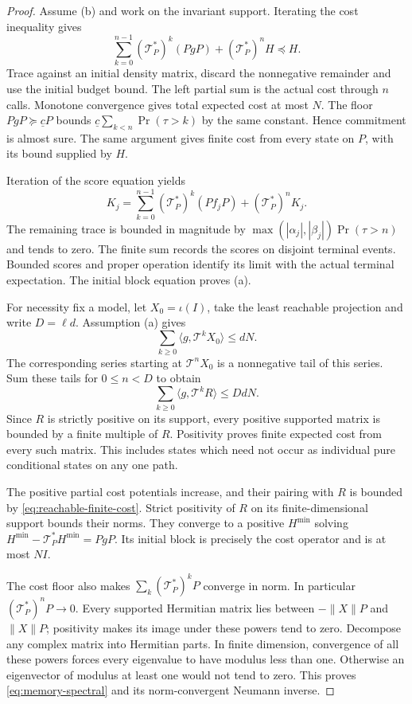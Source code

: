 \begin{proof}
Assume (b) and work on the invariant support. Iterating the cost inequality gives
\[
 \sum_{k=0}^{n-1}(\mathcal T_P^*)^k(PgP)
       +(\mathcal T_P^*)^nH\preccurlyeq H.
\]
Trace against an initial density matrix, discard the nonnegative remainder and use the initial budget bound. The left partial sum is the actual cost through $n$ calls. Monotone convergence gives total expected cost at most $N$. The floor $PgP\succeq\underline cP$ bounds $\underline c\sum_{k<n}\Pr(\tau>k)$ by the same constant. Hence commitment is almost sure. The same argument gives finite cost from every state on $P$, with its bound supplied by $H$.

Iteration of the score equation yields
\[
 K_j=\sum_{k=0}^{n-1}(\mathcal T_P^*)^k(Pf_jP)
                    +(\mathcal T_P^*)^nK_j.
\]
The remaining trace is bounded in magnitude by $\max(|\alpha_j|,|\beta_j|)\Pr(\tau>n)$ and tends to zero. The finite sum records the scores on disjoint terminal events. Bounded scores and proper operation identify its limit with the actual terminal expectation. The initial block equation proves (a).

For necessity fix a model, let $X_0=\iota(I)$, take the least reachable projection and write $D=\ell d$. Assumption (a) gives
\[
 \sum_{k\ge0}\langle g,\mathcal T^kX_0\rangle\le dN.
\]
The corresponding series starting at $\mathcal T^nX_0$ is a nonnegative tail of this series. Sum these tails for $0\le n<D$ to obtain
\begin{equation}\label{eq:reachable-finite-cost}
 \sum_{k\ge0}\langle g,\mathcal T^kR\rangle\le DdN.
\end{equation}
Since $R$ is strictly positive on its support, every positive supported matrix is bounded by a finite multiple of $R$. Positivity proves finite expected cost from every such matrix. This includes states which need not occur as individual pure conditional states on any one path.

The positive partial cost potentials increase, and their pairing with $R$ is bounded by \eqref{eq:reachable-finite-cost}. Strict positivity of $R$ on its finite-dimensional support bounds their norms. They converge to a positive $H^{\min}$ solving $H^{\min}-\mathcal T_P^*H^{\min}=PgP$. Its initial block is precisely the cost operator and is at most $NI$.

The cost floor also makes $\sum_k(\mathcal T_P^*)^kP$ converge in norm. In particular $(\mathcal T_P^*)^nP\to0$. Every supported Hermitian matrix lies between $-\|X\|P$ and $\|X\|P$; positivity makes its image under these powers tend to zero. Decompose any complex matrix into Hermitian parts. In finite dimension, convergence of all these powers forces every eigenvalue to have modulus less than one. Otherwise an eigenvector of modulus at least one would not tend to zero. This proves \eqref{eq:memory-spectral} and its norm-convergent Neumann inverse.


\end{proof}
